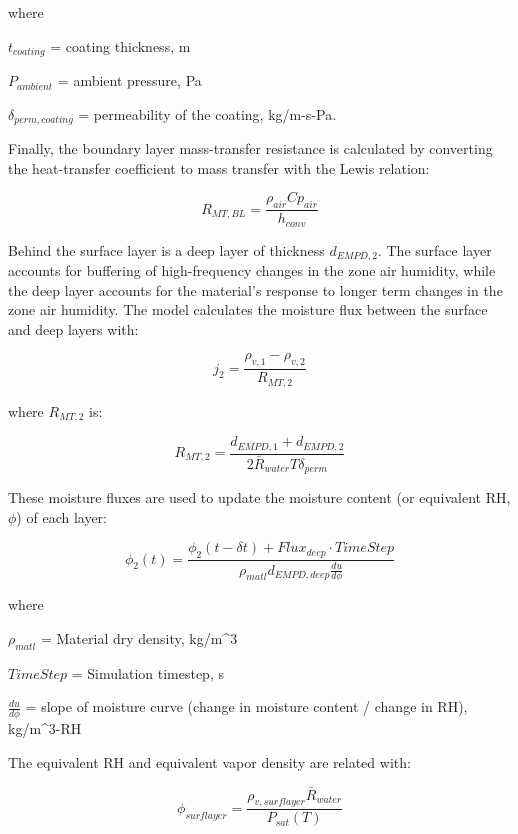 where

$t_{coating}$ = coating thickness, m

$P_{ambient}$ = ambient pressure, Pa

$\delta_{perm,coating}$ = permeability of the coating, kg/m-s-Pa.

Finally, the boundary layer mass-transfer resistance is calculated by converting the heat-transfer coefficient to mass transfer with the Lewis relation:

\begin{equation}
R_{MT,BL} = \frac{\rho_{air} Cp_{air}}{h_{conv}}
\end{equation}

Behind the surface layer is a deep layer of thickness $d_{EMPD,2}$. The surface layer accounts for buffering of high-frequency changes in the zone air humidity, while the deep layer accounts for the material's response to longer term changes in the zone air humidity. The model calculates the moisture flux between the surface and deep layers with:

\begin{equation}
j_{2} = \frac {\rho_{v,1} - \rho_{v,2}} {R_{MT,2}}
\end{equation}

where $R_{MT,2}$ is:

\begin{equation}
R_{MT,2} = \frac {d_{EMPD,1} + d_{EMPD,2}} {2 \bar R_{water} T \delta_{perm} }
\end{equation}

These moisture fluxes are used to update the moisture content (or equivalent RH, $\phi$) of each layer:

\begin{equation}
\phi_{2}(t) = \frac {\phi_{2}(t-\delta t) + Flux_{deep} \cdot TimeStep} {\rho_{matl} d_{EMPD,deep} \frac {du}{d\phi}}
\end{equation}

where

$\rho_{matl}$ = Material dry density, kg/m^3

$TimeStep$ = Simulation timestep, s

$\frac {du}{d\phi}$ = slope of moisture curve (change in moisture content / change in RH), kg/m^3-RH

The equivalent RH and equivalent vapor density are related with:

\begin{equation}
\phi_{surflayer} = \frac {\rho_{v,surflayer} \bar R_{water}} {P_{sat}(T)}
\end{equation}

